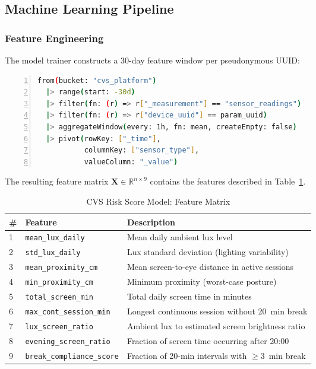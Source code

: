 \documentclass[conference]{IEEEtran}
\begin{document}
\subsection{Machine Learning Pipeline}

\subsubsection{Feature Engineering}

The model trainer constructs a 30-day feature window per pseudonymous UUID:

\begin{lstlisting}[language=bash, caption={Flux Query for 30-Day Feature Window},
  basicstyle=\ttfamily\footnotesize, frame=single, numbers=left]
from(bucket: "cvs_platform")
  |> range(start: -30d)
  |> filter(fn: (r) => r["_measurement"] == "sensor_readings")
  |> filter(fn: (r) => r["device_uuid"] == param_uuid)
  |> aggregateWindow(every: 1h, fn: mean, createEmpty: false)
  |> pivot(rowKey: ["_time"],
           columnKey: ["sensor_type"],
           valueColumn: "_value")
\end{lstlisting}

The resulting feature matrix $\mathbf{X} \in \mathbb{R}^{n \times 9}$ contains the
features described in Table~\ref{tab:features}.

\begin{table}[H]
  \centering
  \caption{CVS Risk Score Model: Feature Matrix}
  \label{tab:features}
  \begin{tabularx}{\textwidth}{p{0.6cm} p{4.5cm} X}
    \toprule
    \textbf{\#} & \textbf{Feature} & \textbf{Description} \\
    \midrule
    1 & \texttt{mean\_lux\_daily}        & Mean daily ambient lux level \\
    2 & \texttt{std\_lux\_daily}         & Lux standard deviation (lighting variability) \\
    3 & \texttt{mean\_proximity\_cm}     & Mean screen-to-eye distance in active sessions \\
    4 & \texttt{min\_proximity\_cm}      & Minimum proximity (worst-case posture) \\
    5 & \texttt{total\_screen\_min}      & Total daily screen time in minutes \\
    6 & \texttt{max\_cont\_session\_min} & Longest continuous session without 20~min break \\
    7 & \texttt{lux\_screen\_ratio}      & Ambient lux to estimated screen brightness ratio \\
    8 & \texttt{evening\_screen\_ratio}  & Fraction of screen time occurring after 20:00 \\
    9 & \texttt{break\_compliance\_score}& Fraction of 20-min intervals with $\geq$3~min break \\
    \bottomrule
  \end{tabularx}
\end{table}
\end{document}
